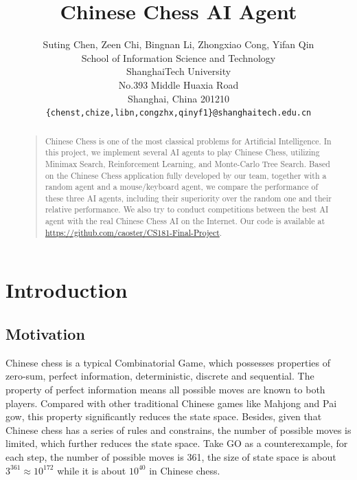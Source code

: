 \documentclass[letterpaper]{article}
\title{Chinese Chess AI Agent}
\author{Suting Chen, Zeen Chi, Bingnan Li, Zhongxiao Cong, Yifan Qin\\
School of Information Science and Technology\\
ShanghaiTech University\\
No.393 Middle Huaxia Road\\
Shanghai, China 201210\\
\texttt{\{chenst,chize,libn,congzhx,qinyf1\}@shanghaitech.edu.cn}
}
\begin{document}
\maketitle

\begin{abstract}
\begin{quote}
Chinese Chess is one of the most classical problems for Artificial Intelligence.
In this project, we implement several AI agents to play Chinese Chess, utilizing Minimax Search, Reinforcement Learning, and Monte-Carlo Tree Search.
Based on the Chinese Chess application fully developed by our team, together with a random agent and a mouse/keyboard agent, we compare the performance of these three AI agents, including their superiority over the random one and their relative performance.
We also try to conduct competitions between the best AI agent with the real Chinese Chess AI on the Internet.
Our code is available at \url{https://github.com/caoster/CS181-Final-Project}.
\end{quote}
\end{abstract}


    \section{Introduction}\label{sec:introduction}

    \subsection{Motivation}\label{subsec:motivation}
    Chinese chess is a typical Combinatorial Game, which possesses properties of zero-sum, perfect information, deterministic, discrete and sequential.
    The property of perfect information means all possible moves are known to both players.
    Compared with other traditional Chinese games like Mahjong and Pai gow, this property significantly reduces the state space.
    Besides, given that Chinese chess has a series of rules and constrains, the number of possible moves is limited, which further reduces the state space.
    Take GO as a counterexample, for each step, the number of possible moves is 361, the size of state space is about $3^{361}\approx 10^{172}$ while it is about $10^{40}$ in Chinese chess.
\end{document}
